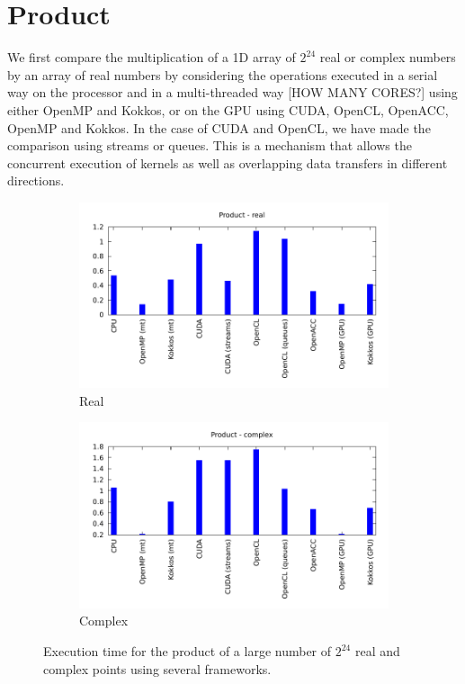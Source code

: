 \documentclass[12pt, a4paper]{article}
\begin{document}
\section{Product}\label{PRODUCT}
We first compare the multiplication of a 1D array of $2^{24}$ real or
complex numbers by an array of real numbers by considering the
operations executed in a serial way on the processor and in a
multi-threaded way [HOW MANY CORES?] using either OpenMP and Kokkos, or
on the GPU using CUDA, OpenCL, OpenACC, OpenMP and Kokkos. In the case
of CUDA and OpenCL, we have made the comparison using streams or
queues. This is a mechanism that allows the concurrent execution of
kernels as well as overlapping data transfers in different directions.
\begin{figure}[H]
\captionsetup{width=0.8\linewidth}
\centering
\begin{subfigure}{.5\textwidth}
\centering
\includegraphics[width=.9\linewidth]{graphs/product-r.pdf}
\caption{Real}
\label{PRODR}
\end{subfigure}%
\begin{subfigure}{.5\textwidth}
\centering
\includegraphics[width=.9\linewidth]{graphs/product-c.pdf}
\caption{Complex}
\label{PRODC}
\end{subfigure}
\caption{Execution time for the product of a large number of $2^{24}$ real and complex points using several frameworks.}
\label{1DFFTW}
\end{figure}
\end{document}
